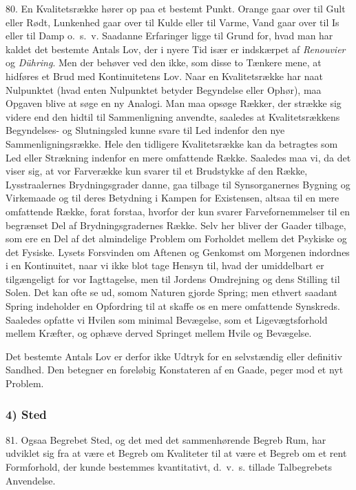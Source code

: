 \documentclass[12pt,a4paper]{book}
\newcommand{\apage}[1]{\marginnote{\footnotesize\textit{[#1]}}}
\begin{document}
80. En Kvalitetsrække hører op paa et bestemt Punkt. Orange gaar over
til Gult eller Rødt, Lunkenhed gaar over til Kulde eller til Varme, Vand
gaar over til Is eller til Damp o.\ s.\ v. Saadanne Erfaringer ligge til
Grund for, hvad man har kaldet det bestemte Antals Lov, der i nyere Tid
især er indskærpet af \emph{Renouvier} og \emph{Dühring}. Men der
behøver ved den ikke, som disse to Tænkere mene, at hidføres et Brud med
Kontinuitetens Lov. Naar en Kvalitetsrække har naat Nulpunktet (hvad
enten Nulpunktet betyder Begyndelse eller Ophør), maa Opgaven blive at
søge en ny Analogi. Man maa opsøge Rækker, der strække sig videre end
den hidtil til Sammenligning anvendte, saaledes at Kvalitetsrækkens
Begyndelses- og Slutningsled kunne svare til Led indenfor den nye
Sammenligningsrække. Hele den tidligere Kvalitetsrække kan da betragtes
som Led eller Strækning indenfor en mere omfattende Række. Saaledes maa
vi, da det viser sig, at vor Farverække kun svarer til et Brudstykke af
den Række, Lysstraalernes Brydningsgrader danne, gaa tilbage til
Synsorganernes Bygning og Virkemaade og til deres Betydning i Kampen for
Existensen, altsaa til en mere omfattende Række, forat forstaa, hvorfor
der kun svarer Farvefornemmelser til en begrænset Del af
Brydningsgradernes Række. Selv her bliver der Gaader tilbage, som ere en
Del af det almindelige Problem om Forholdet mellem det Psykiske og det
Fysiske. Lysets Forsvinden om Aftenen og Genkomst om Morgenen indordnes
i en Kontinuitet, naar vi ikke blot tage Hensyn til, hvad der
umiddelbart er tilgængeligt for vor Iagttagelse, men til Jordens
Omdrejning og dens Stilling til Solen. Det kan ofte se ud, somom Naturen
gjorde Spring; men ethvert saadant Spring indeholder en \apage{197} Opfordring til
at skaffe os en mere omfattende Synskreds. Saaledes opfatte vi Hvilen
som minimal Bevægelse, som et Ligevægtsforhold mellem Kræfter, og
ophæve derved Springet mellem Hvile og Bevægelse.

Det bestemte Antals Lov er derfor ikke Udtryk for en selvstændig eller
definitiv Sandhed. Den betegner en foreløbig Konstateren af en Gaade,
peger mod et nyt Problem.

\subsubsection*{4) Sted}

81. Ogsaa Begrebet Sted, og det med det sammenhørende Begreb Rum, har
udviklet sig fra at være et Begreb om Kvaliteter til at være et Begreb
om et rent Formforhold, der kunde bestemmes kvantitativt, d.\ v.\ s.
tillade Talbegrebets Anvendelse.
\end{document}
